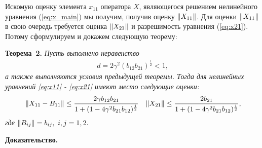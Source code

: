 
Искомую оценку элемента $x_{11}$ оператора $X$, являющегося решением нелинейного уравнения (\ref{eq:x_main}) мы получим, получив оценку $\left\|X_{11}\right\|$. Для оценки $\left\|X_{11}\right\|$ в свою очередь требуется оценка $\left\|X_{21}\right\|$ и разрешимость уравнения (\ref{eq:x21}). Потому сформулируем и докажем следующую теорему:

\noindent\textbf{Теорема~2.}
{ \it Пусть выполнено неравенство
\begin{align}
d = 2\gamma^2 (b_{12}b_{21})^{\frac{1}{2}} < 1, \label{coef}
\end{align}
а также выполняются условия предыдущей теоремы. 
Тогда для нелинейных уравнений \eqref{eq:x11} - \eqref{eq:x21} имеют место следующие оценки:
\begin{align*}
&\left\|X_{11} - B_{11}\right\| \leq \frac{2\gamma b_{12}b_{21}}{1 + (1 - 4\gamma^2 b_{21}b_{12})^{\frac{1}{2}}}
&\left\|X_{21}\right\| \leq \frac{2b_{21}}{1 + (1 - 4\gamma^2 b_{21}b_{12})^{\frac{1}{2}}},
\end{align*}
где $\left\|B_{ij}\right\| = b_{ij},\ i,j = 1,2.$}

\noindent\textbf{Доказательство.}

